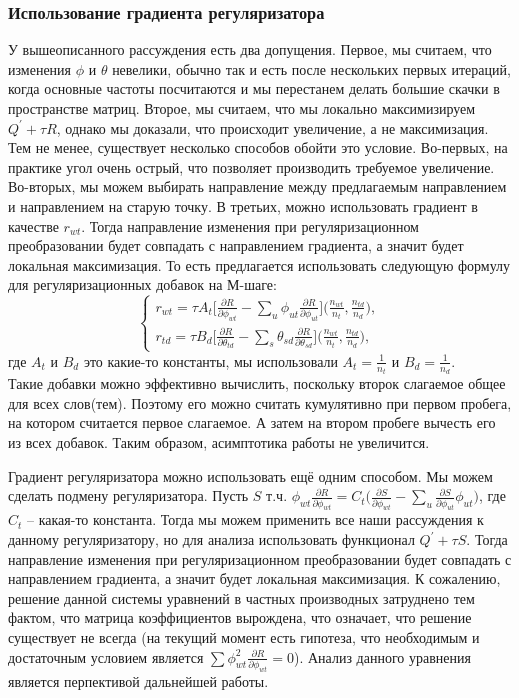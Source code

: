 \documentclass[12pt]{article}
\begin{document}
\subsubsection{Использование градиента регуляризатора}
У вышеописанного рассуждения есть два допущения. Первое, мы считаем, что изменения $\phi$ и $\theta$ невелики, обычно так и есть после нескольких первых итераций, когда основные частоты посчитаются и мы  перестанем делать большие скачки в пространстве матриц. Второе, мы считаем, что мы локально максимизируем $Q^{\prime} + \tau R$, однако мы доказали, что происходит увеличение, а не максимизация. Тем не менее, существует несколько способов обойти это условие. Во-первых, на практике угол очень острый, что позволяет производить требуемое увеличение. Во-вторых, мы можем выбирать направление между предлагаемым направлением и направлением на старую точку. В третьих, можно использовать градиент в качестве $r_{wt}$. Тогда направление изменения при регуляризационном преобразовании будет совпадать с направлением градиента, а значит будет локальная максимизация. То есть предлагается использовать следующую формулу для регуляризационных добавок на М-шаге:
\[
\left\{
	\begin{aligned}
		r_{wt} = \tau A_t \bigg[{\frac{\partial{R}}{\partial{\phi_{wt}}} - \sum\limits_u \phi_{ut} \frac{\partial{R}}{\partial{\phi_{ut}}} }\bigg] \bigg(\frac{n_{wt}}{n_t}, \frac{n_{td}}{n_d}\bigg),\\
		r_{td} = \tau B_d \bigg[ {\frac{\partial{R}}{\partial{\theta_{td}}} - \sum\limits_s \theta_{sd} \frac{\partial{R}}{\partial{\theta_{sd}}} }\bigg] \bigg(\frac{n_{wt}}{n_t}, \frac{n_{td}}{n_d}\bigg) ,
	\end{aligned}
\right.
\]
где $A_t$ и $B_d$ это какие-то константы, мы использовали $A_t = \frac{1}{n_t}$ и $B_d = \frac{1}{n_d}$.\\
Такие добавки можно эффективно вычислить, поскольку второк слагаемое общее для всех слов(тем). Поэтому его можно считать кумулятивно при первом пробега, на котором считается первое слагаемое. А затем на втором пробеге вычесть его из всех добавок. Таким образом, асимптотика работы не увеличится. 

Градиент регуляризатора можно использовать ещё одним способом. Мы можем сделать подмену регуляризатора. Пусть $S$ т.ч. $\phi_{wt}\frac{\partial{R}}{\partial{\phi_{wt}}} = C_t \bigg( \frac{\partial{S}}{\partial{\phi_{wt}}} - \sum_{u}  \frac{\partial{S}}{\partial{\phi_{ut}}} \phi_{ut} \bigg)$, где $C_t$ -- какая-то константа. Тогда мы можем применить все наши рассуждения к данному регуляризатору, но для анализа использовать функционал $Q^{\prime} + \tau S$. Тогда направление изменения при регуляризационном преобразовании будет совпадать с направлением градиента, а значит будет локальная максимизация. К сожалению, решение данной системы уравнений в частных производных затруднено тем фактом, что матрица коэффициентов вырождена, что означает, что решение существует не всегда (на текущий момент есть гипотеза, что необходимым и достаточным условием является $\sum \phi_{wt}^2 \frac{\partial{R}}{\partial{\phi_{wt}}} = 0$). Анализ данного уравнения является перпективой дальнейшей работы.
\end{document}
